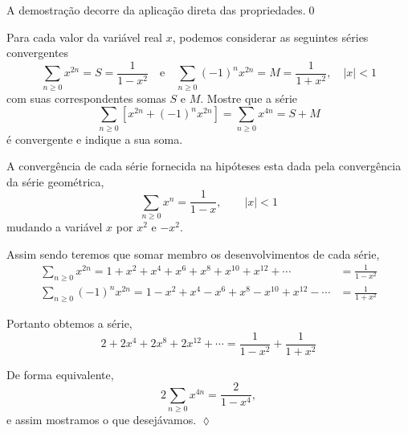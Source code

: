 \prova A demostra\c{c}\~{a}o decorre da aplica\c{c}\~{a}o direta das propriedades.\qed

\begin{exer}
Para cada valor da vari\'{a}vel real $x$, podemos considerar as
seguintes s\'{e}ries convergentes
\begin{equation*}
    \sum_{n\ge 0}x^{2n}=S=\frac{1}{1-x^2}\quad \text{e}\quad \sum_{n\ge
    0}(-1)^{n}x^{2n}=M=\frac{1}{1+x^2}, \quad |x|<1
\end{equation*}
com suas correspondentes somas $S$ e $M$. Mostre que a s\'{e}rie
\begin{equation*}
\sum_{n\ge 0}[x^{2n}+(-1)^{n}x^{2n}]= \sum_{n\ge 0}x^{4n}=S+M
\end{equation*}
\'{e} convergente e indique a sua soma.
\end{exer}

\solo A converg\^{e}ncia de cada s\'{e}rie fornecida na hip\'{o}teses esta dada
pela converg\^{e}ncia da s\'{e}rie geom\'{e}trica,
\begin{equation*}
    \sum_{n\ge 0}x^n=\frac{1}{1-x},\qquad |x|<1
\end{equation*}
mudando a vari\'{a}vel $x$ por $x^2$ e $-x^2$.

Assim sendo teremos que somar membro os desenvolvimentos de cada
s\'{e}rie,
\begin{align*}
\sum_{n\ge 0}x^{2n}=1+x^2+x^4+x^6+x^8+x^{10}+x^{12}+\cdots&=\frac{1}{1-x^2}\\[2ex]
\sum_{n\ge
0}(-1)^nx^{2n}=1-x^2+x^4-x^6+x^8-x^{10}+x^{12}-\cdots&=\frac{1}{1+x^2}
\end{align*}

Portanto obtemos a s\'{e}rie,
\begin{equation*}
    2+2x^4+2x^8+2x^{12}+\cdots=\frac{1}{1-x^2}+\frac{1}{1+x^2}
\end{equation*}

De forma equivalente,
\begin{equation*}
    2\sum_{n\ge 0}x^{4n}=\frac{2}{1-x^4},
\end{equation*}
e assim mostramos o que desejávamos. \hfill \(\lozenge\)

